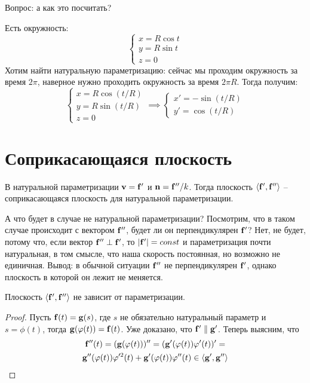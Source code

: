\documentclass[main]{subfiles}
\begin{document}
Вопрос: а как это посчитать?
\begin{example}
    Есть окружность:
    \[\begin{cases}
            x = R \cos t \\
            y = R \sin t \\
            z = 0
        \end{cases}\]
    Хотим найти натуральную параметризацию:
    сейчас мы проходим окружность за время $2\pi$, наверное нужно проходить окружность за время $2\pi R$.
    Тогда получим:
    \[\begin{cases}
            x = R\cos (t/R)  \\
            y = R \sin (t/R) \\
            z = 0
        \end{cases}
        \implies
        \begin{cases}
            x' = - \sin (t/R) \\
            y' = \cos (t/R)
        \end{cases}\]
\end{example}

\section{Соприкасающаяся плоскость}
В натуральной параметризации $\mathbf{v} = \mathbf{f}'$ и $\mathbf{n} = \mathbf{f}''/k$.
Тогда плоскость $\langle \mathbf{f}', \mathbf{f}''\rangle$ -- соприкасающаяся плоскость для натуральной параметризации.

А что будет в случае не натуральной параметризации?
Посмотрим, что в таком случае происходит с вектором $\mathbf{f}''$, будет ли он перпендикулярен $\mathbf{f}'$?
Нет, не будет, потому что, если вектор $\mathbf{f}'' \perp \mathbf{f}'$, то $|\mathbf{f}'| = const$
и параметризация почти натуральная, в том смысле, что наша скорость постоянная, но возможно не единичная.
Вывод: в обычной ситуации $\mathbf{f}''$ не перпендикулярен $\mathbf{f}'$, однако плоскость в которой он лежит не меняется.

\begin{theorem}
    Плоскость $\langle \mathbf{f}', \mathbf{f}''\rangle$ не зависит от параметризации.
\end{theorem}
\begin{proof}
    Пусть $\mathbf{f}(t) = \mathbf{g}(s)$, где $s$ не обязательно натуральный параметр и $s = \phi(t)$, тогда $\mathbf{g}(\varphi(t)) = \mathbf{f}(t)$.
    Уже доказано, что $\mathbf{f}' \parallel \mathbf{g}'$.
    Теперь выясним, что
    \begin{multline*}
        \mathbf{f}''(t) = (\mathbf{g}(\varphi(t)))'' = (\mathbf{g}'(\varphi(t)) \varphi'(t))' = \\
        \mathbf{g}''(\varphi(t)) \varphi'^2(t) + \mathbf{g}'(\varphi(t)) \varphi''(t) \in \langle \mathbf{g}', \mathbf{g}''\rangle
    \end{multline*}
\end{proof}
\end{document}
